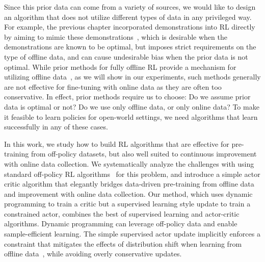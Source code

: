 Since this prior data can come from a variety of sources, we would like to design an algorithm that does not utilize different types of data in any privileged way. For example, the previous chapter incorporated demonstrations into RL directly by aiming to mimic these demonstrations~\citep{nair2018demonstrations}, which is desirable when the demonstrations are known to be optimal, but imposes strict requirements on the type of offline data, and can cause undesirable bias when the prior data is not optimal. While prior methods for fully offline RL provide a mechanism for utilizing offline data~\citep{fujimoto19bcq, kumar19bear}, as we will show in our experiments, such methods generally are not effective for fine-tuning with online data as they are often too conservative. In effect, prior methods require us to choose: Do we assume prior data is optimal or not? Do we use only offline data, or only online data? To make it feasible to learn policies for open-world settings, we need algorithms that learn successfully in any of these cases. 

In this work, we study how to build RL algorithms that are effective for pre-training from off-policy datasets, but also well suited to continuous improvement with online data collection. We systematically analyze the challenges with using standard off-policy RL algorithms~\citep{haarnoja2018sac, kumar19bear, we2018mpo} for this problem, and introduce a simple actor critic algorithm that elegantly bridges data-driven pre-training from offline data and improvement with online data collection. Our method, which uses dynamic programming to train a critic but a supervised learning style update to train a constrained actor, combines the best of supervised learning and actor-critic algorithms. Dynamic programming can leverage off-policy data and enable sample-efficient learning. The simple supervised actor update implicitly enforces a constraint that mitigates the effects of distribution shift when learning from offline data~\citep{fujimoto19bcq, kumar19bear}, while avoiding overly conservative updates.

